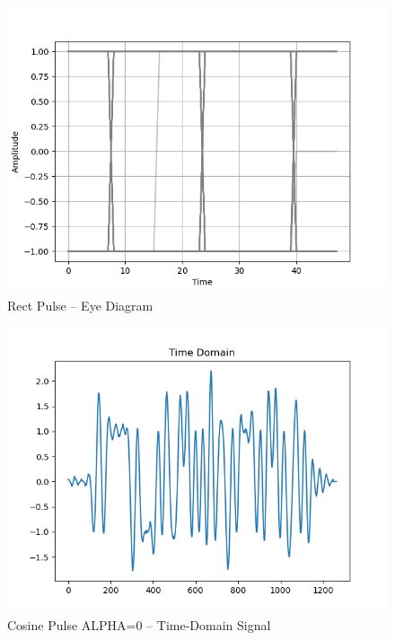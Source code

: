 \documentclass[
	letterpaper, %
	10pt, %
]{CSUniSchoolLabReport}
\begin{document}
\begin{figure}[H] %
	\centering %
	\includegraphics[width=1.2\textwidth]{assignment2c.png} %
	\caption{Rect Pulse -- Eye Diagram}
	\label{fig:block}
\end{figure}

\begin{figure}[H] %
	\centering %
	\includegraphics[width=1.2\textwidth]{assignment2d.png} %
	\caption{Cosine Pulse ALPHA=0 -- Time-Domain Signal}
	\label{fig:block}
\end{figure}
\end{document}
